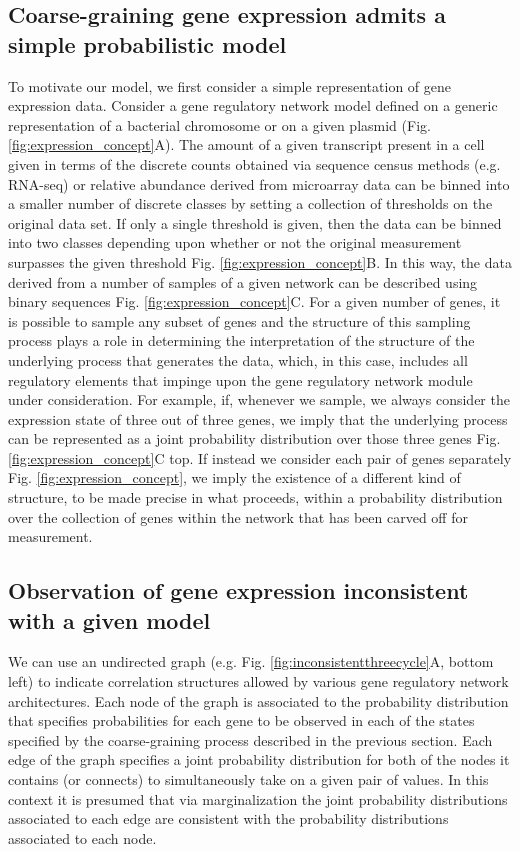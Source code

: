 \subsection*{Coarse-graining gene expression admits a simple probabilistic model}
To motivate our model, we first consider a simple representation of gene expression data. Consider a gene regulatory network model defined on a generic representation of a bacterial chromosome or on a given plasmid (Fig. \ref{fig:expression_concept}A). The amount of a given transcript present in a cell given in terms of the discrete counts obtained via sequence census methods (e.g. RNA-seq) or relative abundance derived from microarray data can be binned into a smaller number of discrete classes by setting a collection of thresholds on the original data set. If only a single threshold is given, then the data can be binned into two classes depending upon whether or not the original measurement surpasses the given threshold Fig. \ref{fig:expression_concept}B. In this way, the data derived from a number of samples of a given network can be described using binary sequences Fig. \ref{fig:expression_concept}C. For a given number of genes, it is possible to sample any subset of genes and the structure of this sampling process plays a role in determining the interpretation of the structure of the underlying process that generates the data, which, in this case, includes all regulatory elements that impinge upon the gene regulatory network module under consideration. For example, if, whenever we sample, we always consider the expression state of three out of three genes, we imply that the underlying process can be represented as a joint probability distribution over those three genes Fig. \ref{fig:expression_concept}C top. If instead we consider each pair of genes separately Fig. \ref{fig:expression_concept}, we imply the existence of a different kind of structure, to be made precise in what proceeds, within a probability distribution over the collection of genes within the network that has been carved off for measurement.

\subsection*{Observation of gene expression inconsistent with a given model}
We can use an undirected graph (e.g. Fig. \ref{fig:inconsistentthreecycle}A, bottom left) to indicate correlation structures allowed by various gene regulatory network architectures. Each node of the graph is associated to the probability distribution that specifies probabilities for each gene to be observed in each of the states specified by the coarse-graining process described in the previous section. Each edge of the graph specifies a joint probability distribution for both of the nodes it contains (or connects) to simultaneously take on a given pair of values. In this context it is presumed that via marginalization the joint probability distributions associated to each edge are consistent with the probability distributions associated to each node.

